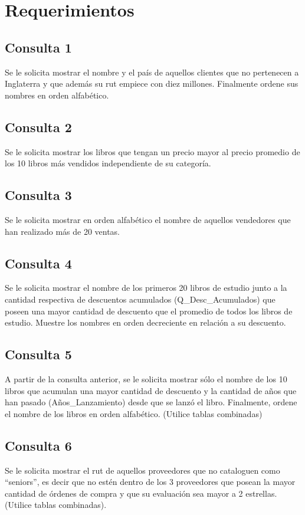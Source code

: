 \documentclass[letterpaper]{article}
\begin{document}
\section{Requerimientos}

\subsection*{Consulta 1}
Se le solicita mostrar el nombre y el país de aquellos clientes que no pertenecen a Inglaterra y que además su rut empiece con diez millones. Finalmente ordene sus nombres en orden alfabético.

\subsection*{Consulta 2}
Se le solicita mostrar los libros que tengan un precio mayor al precio promedio de los 10 libros más vendidos independiente de su categoría.

\subsection*{Consulta 3}
Se le solicita mostrar en orden alfabético el nombre de aquellos vendedores que han realizado más de 20 ventas.

\subsection*{Consulta 4}
Se le solicita mostrar el nombre de los primeros 20 libros de estudio junto a la cantidad respectiva de descuentos acumulados (Q\_Desc\_Acumulados) que poseen una mayor cantidad de descuento que el promedio de todos los libros de estudio. Muestre los nombres en orden decreciente en relación a su descuento.
 
\subsection*{Consulta 5}
A partir de la consulta anterior, se le solicita mostrar sólo el nombre de los 10 libros que acumulan una mayor cantidad de descuento y la cantidad de años que han pasado (Años\_Lanzamiento) desde que se lanzó el libro. Finalmente, ordene el nombre de los libros en orden alfabético. (Utilice tablas combinadas)

\subsection*{Consulta 6}
Se le solicita mostrar el rut de aquellos proveedores que no cataloguen como “seniors”, es decir que no estén dentro de los 3 proveedores que posean la mayor cantidad de órdenes de compra y que su evaluación sea mayor a 2 estrellas. (Utilice tablas combinadas).
\end{document}
